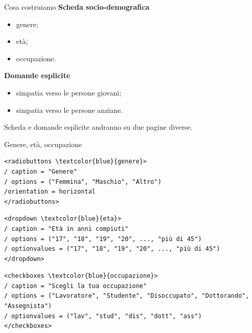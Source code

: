 \documentclass[compress]{beamer}
\begin{document}
\begin{frame}{Cosa costruiamo}
\textbf{Scheda socio-demografica}
\begin{itemize}
  \item genere;
  \item età;
  \item occupazione.
\end{itemize}

\vspace{3mm}
\textbf{Domande esplicite}
\begin{itemize}
  \item simpatia verso le persone giovani;
  \item simpatia verso le persone anziane.
\end{itemize}

\vspace{3mm}
Scheda e domande esplicite andranno su due pagine diverse.
\end{frame}

\begin{frame}[fragile]{Genere, età, occupazione}
\begin{small}
\begin{Verbatim}[commandchars=\\\{\}]
<radiobuttons \textcolor{blue}{genere}>
/ caption = "Genere"
/ options = ("Femmina", "Maschio", "Altro")
/orientation = horizontal
</radiobuttons>
\end{Verbatim}
\end{small}

\begin{small}
\begin{Verbatim}[commandchars=\\\{\}]
<dropdown \textcolor{blue}{eta}>
/ caption = "Età in anni compiuti"
/ options = ("17", "18", "19", "20", ..., "più di 45")
/ optionvalues = ("17", "18", "19", "20", ..., "più di 45")
</dropdown>
\end{Verbatim}
\end{small}

\begin{small}
\begin{Verbatim}[commandchars=\\\{\}]
<checkboxes \textcolor{blue}{occupazione}>
/ caption = "Scegli la tua occupazione"
/ options = ("Lavoratore", "Studente", "Disoccupato", "Dottorando", 
"Assegnista")
/ optionvalues = ("lav", "stud", "dis", "dott", "ass")
</checkboxes>
\end{Verbatim}
\end{small}
\end{frame}
\end{document}
